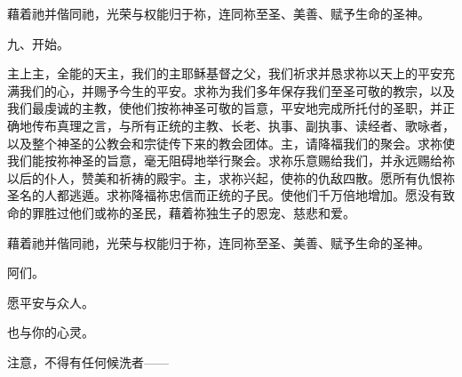 \par

藉着祂并偕同祂，光荣与权能归于祢，连同祢至圣、美善、赋予生命的圣神。\par

\par

九、开始。\par

\par

\par

主上主，全能的天主，我们的主耶稣基督之父，我们祈求并恳求祢以天上的平安充满我们的心，并赐予今生的平安。求祢为我们多年保存我们至圣可敬的教宗，以及我们最虔诚的主教，使他们按祢神圣可敬的旨意，平安地完成所托付的圣职，并正确地传布真理之言，与所有正统的主教、长老、执事、副执事、读经者、歌咏者，以及整个神圣的公教会和宗徒传下来的教会团体。主，请降福我们的聚会。求祢使我们能按祢神圣的旨意，毫无阻碍地举行聚会。求祢乐意赐给我们，并永远赐给祢以后的仆人，赞美和祈祷的殿宇。主，求祢兴起，使祢的仇敌四散。愿所有仇恨祢圣名的人都逃遁。求祢降福祢忠信而正统的子民。使他们千万倍地增加。愿没有致命的罪胜过他们或祢的圣民，藉着祢独生子的恩宠、慈悲和爱。\par

\par

藉着祂并偕同祂，光荣与权能归于祢，连同祢至圣、美善、赋予生命的圣神。\par

\par

阿们。\par

\par

愿平安与众人。\par

\par

也与你的心灵。\par

\par

注意，不得有任何候洗者——\par


